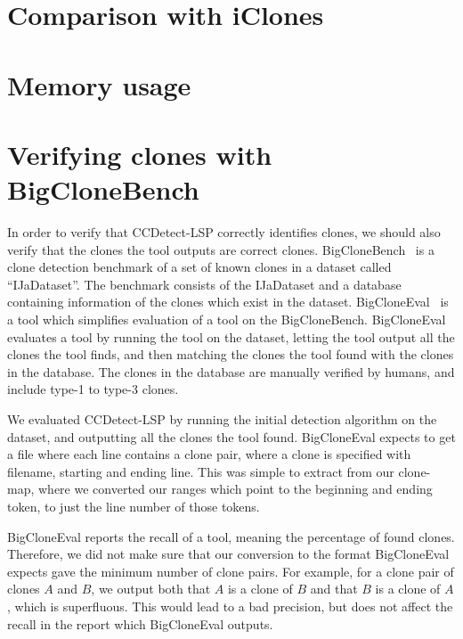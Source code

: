 

\section{Comparison with iClones}

\section{Memory usage}

\section{Verifying clones with BigCloneBench}

In order to verify that CCDetect-LSP correctly identifies clones, we should also verify
that the clones the tool outputs are correct clones. BigCloneBench~\cite{BigCloneBench}
is a clone detection benchmark of a set of known clones in a dataset called
``IJaDataset''. The benchmark consists of the IJaDataset and a database containing
information of the clones which exist in the dataset. BigCloneEval~\cite{BigCloneEval} is
a tool which simplifies evaluation of a tool on the BigCloneBench. BigCloneEval evaluates
a tool by running the tool on the dataset, letting the tool output all the clones the tool
finds, and then matching the clones the tool found with the clones in the database. The
clones in the database are manually verified by humans, and include type-1 to type-3
clones.

We evaluated CCDetect-LSP by running the initial detection algorithm on the dataset, and
outputting all the clones the tool found. BigCloneEval expects to get a file where each
line contains a clone pair, where a clone is specified with filename, starting and
ending line. This was simple to extract from our clone-map, where we converted our ranges
which point to the beginning and ending token, to just the line number of those tokens.

BigCloneEval reports the recall of a tool, meaning the percentage of found clones.
Therefore, we did not make sure that our conversion to the format BigCloneEval expects
gave the minimum number of clone pairs. For example, for a clone pair of clones $A$ and
$B$, we output both that $A$ is a clone of $B$ and that $B$ is a clone of $A$, which is
superfluous. This would lead to a bad precision, but does not affect the recall in the
report which BigCloneEval outputs.

